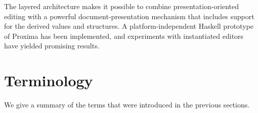 
The layered architecture makes it possible to combine presentation-oriented editing with a powerful document-presentation mechanism that includes support for the derived values and structures. A platform-independent Haskell prototype of Proxima has been implemented, and experiments with instantiated editors have yielded promising results.



 


\section{Terminology}\label{sect:terminology}

We give a summary of the terms that were introduced in the previous sections.

